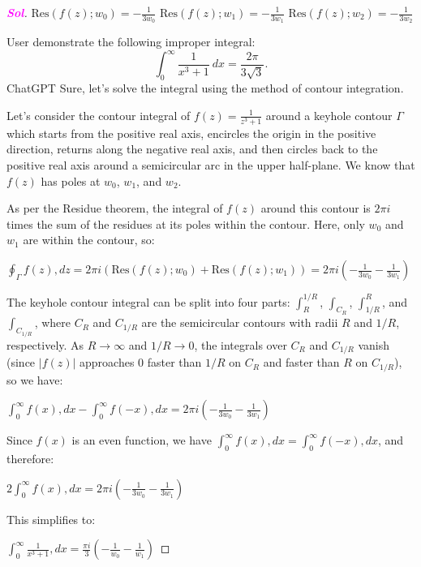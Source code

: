 \documentclass{article}
\theoremstyle{definition}
\newcommand{\sol}{\textcolor{magenta}{\bf Sol}}
\begin{document}
\begin{enumerate}[\bf 1.]
\begin{proof}[\sol]
		$\text{Res}(f(z); w_0) = -\frac{1}{3 w_0}$
		$\text{Res}(f(z); w_1) = -\frac{1}{3 w_1}$
		$\text{Res}(f(z); w_2) = -\frac{1}{3 w_2}$
		
		
		
		
		User
		demonstrate the following improper integral:\[
		\int_{0}^{\infty}\frac{1}{x^3+1}\ dx=\frac{2\pi}{3\sqrt{3}}.
		\]
		ChatGPT
		Sure, let's solve the integral using the method of contour integration.
		
		Let's consider the contour integral of $f(z) = \frac{1}{z^3 + 1}$ around a keyhole contour $\Gamma$ which starts from the positive real axis, encircles the origin in the positive direction, returns along the negative real axis, and then circles back to the positive real axis around a semicircular arc in the upper half-plane. We know that $f(z)$ has poles at $w_0$, $w_1$, and $w_2$.
		
		As per the Residue theorem, the integral of $f(z)$ around this contour is $2\pi i$ times the sum of the residues at its poles within the contour. Here, only $w_0$ and $w_1$ are within the contour, so:
		
		$\oint_{\Gamma} f(z),dz = 2\pi i (\text{Res}(f(z); w_0) + \text{Res}(f(z); w_1)) = 2\pi i (-\frac{1}{3 w_0} -\frac{1}{3 w_1})$
		
		The keyhole contour integral can be split into four parts: $\int_{R}^{1/R}$, $\int_{C_R}$, $\int_{1/R}^{R}$, and $\int_{C_{1/R}}$, where $C_R$ and $C_{1/R}$ are the semicircular contours with radii $R$ and $1/R$, respectively. As $R\rightarrow\infty$ and $1/R\rightarrow 0$, the integrals over $C_R$ and $C_{1/R}$ vanish (since $|f(z)|$ approaches 0 faster than $1/R$ on $C_R$ and faster than $R$ on $C_{1/R}$), so we have:
		
		$\int_{0}^{\infty} f(x),dx - \int_{0}^{\infty} f(-x),dx = 2\pi i (-\frac{1}{3 w_0} -\frac{1}{3 w_1})$
		
		Since $f(x)$ is an even function, we have $\int_{0}^{\infty} f(x),dx = \int_{0}^{\infty} f(-x),dx$, and therefore:
		
		$2\int_{0}^{\infty} f(x),dx = 2\pi i (-\frac{1}{3 w_0} -\frac{1}{3 w_1})$
		
		This simplifies to:
		
		$\int_{0}^{\infty} \frac{1}{x^3 + 1},dx = \frac{\pi i}{3} (-\frac{1}{w_0} -\frac{1}{w_1})$
		

\end{proof}
\end{enumerate}
\end{document}
